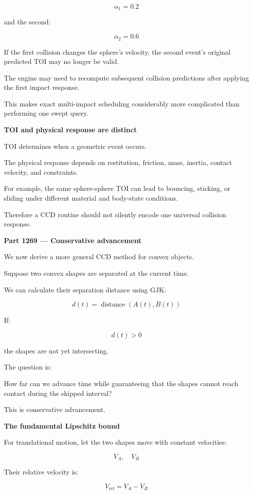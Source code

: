 \[
\alpha_1=0.2
\]

and the second:

\[
\alpha_2=0.6
\]

If the first collision changes the sphere's velocity, the second event's original predicted TOI may no longer be valid.

The engine may need to recompute subsequent collision predictions after applying the first impact response.

This makes exact multi-impact scheduling considerably more complicated than performing one swept query.

\textbf{TOI and physical response are distinct}

TOI determines when a geometric event occurs.

The physical response depends on restitution, friction, mass, inertia, contact velocity, and constraints.

For example, the same sphere-sphere TOI can lead to bouncing, sticking, or sliding under different material and body-state conditions.

Therefore a CCD routine should not silently encode one universal collision response.

\textbf{Part 1269 --- Conservative advancement}

We now derive a more general CCD method for convex objects.

Suppose two convex shapes are separated at the current time.

We can calculate their separation distance using GJK:

\[
\boxed{ d(t)=\operatorname{distance}(A(t),B(t)) }
\]

If:

\[
d(t)>0
\]

the shapes are not yet intersecting.

The question is:

How far can we advance time while guaranteeing that the shapes cannot reach contact during the skipped interval?

This is conservative advancement.

\textbf{The fundamental Lipschitz bound}

For translational motion, let the two shapes move with constant velocities:

\[
V_A,\quad V_B
\]

Their relative velocity is:

\[
V_{\mathrm{rel}}=V_A-V_B
\]

